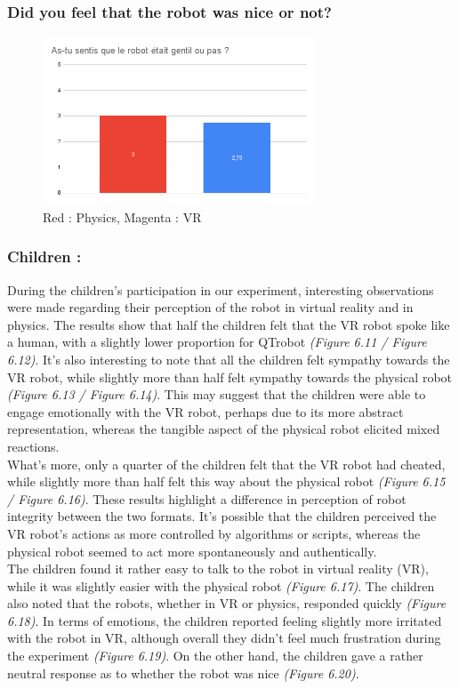     \vspace*{0.5cm}

    \subsubsection{Did you feel that the robot was nice or not?}
    \begin{figure}[!h]
    \centering
    \includegraphics[height=5cm]{Datas_childs/gentil_ou_pas.png}
    \caption{Red : Physics, Magenta : VR}
    \end{figure}
    \vspace*{0.5cm}

\subsubsection{Children :}
During the children's participation in our experiment, interesting observations were made regarding their perception of the robot in virtual reality and in physics. The results show that half the children felt that the VR robot spoke like a human, with a slightly lower proportion for QTrobot \textit{(Figure 6.11 / Figure 6.12)}. It's also interesting to note that all the children felt sympathy towards the VR robot, while slightly more than half felt sympathy towards the physical robot \textit{(Figure 6.13 / Figure 6.14)}. This may suggest that the children were able to engage emotionally with the VR robot, perhaps due to its more abstract representation, whereas the tangible aspect of the physical robot elicited mixed reactions.\\
What's more, only a quarter of the children felt that the VR robot had cheated, while slightly more than half felt this way about the physical robot \textit{(Figure 6.15 / Figure 6.16)}. These results highlight a difference in perception of robot integrity between the two formats. It's possible that the children perceived the VR robot's actions as more controlled by algorithms or scripts, whereas the physical robot seemed to act more spontaneously and authentically.\\
The children found it rather easy to talk to the robot in virtual reality (VR), while it was slightly easier with the physical robot \textit{(Figure 6.17)}. The children also noted that the robots, whether in VR or physics, responded quickly \textit{(Figure 6.18)}. In terms of emotions, the children reported feeling slightly more irritated with the robot in VR, although overall they didn't feel much frustration during the experiment \textit{(Figure 6.19)}. On the other hand, the children gave a rather neutral response as to whether the robot was nice \textit{(Figure 6.20)}.
\newpage
